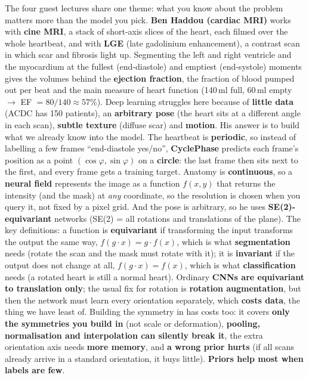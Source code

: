 \documentclass[a4paper]{article}
\newcommand{\K}[1]{\textcolor{kg}{\textbf{#1}}}
\newcommand{\F}[1]{\textcolor{fb}{#1}}
\newcommand{\E}[1]{\textcolor{ep}{#1}}
\newcommand{\T}[1]{\textcolor{tr}{\textbf{#1}}}
\newcommand{\ra}{\ensuremath{\to}}
\begin{document}
The four guest lectures share one theme: what you know about the problem matters more than the model you pick. \textbf{Ben Haddou (cardiac MRI)} works with \K{cine MRI}, a stack of short-axis slices of the heart, each filmed over the whole heartbeat, and with \K{LGE} (late gadolinium enhancement), a contrast scan in which scar and fibrosis light up. Segmenting the left and right ventricle and the myocardium at the fullest (end-diastole) and emptiest (end-systole) moments gives the volumes behind the \K{ejection fraction}, the fraction of blood pumped out per beat and the main measure of heart function (\E{140\,ml full, 60\,ml empty \ra{} EF $=80/140\approx57\%$}). Deep learning struggles here because of \K{little data} (ACDC has 150 patients), an \K{arbitrary pose} (the heart sits at a different angle in each scan), \K{subtle texture} (diffuse scar) and \K{motion}. His answer is to build what we already know into the model. The heartbeat is \K{periodic}, so instead of labelling a few frames ``end-diastole yes/no'', \K{CyclePhase} predicts each frame's position as a point $(\cos\varphi,\sin\varphi)$ on a \K{circle}: the last frame then sits next to the first, and every frame gets a training target.
Anatomy is \K{continuous}, so a \K{neural field} represents the image as a function $f(x,y)$ that returns the intensity (and the mask) at \emph{any} coordinate, so the resolution is chosen when you query it, not fixed by a pixel grid. And the pose is arbitrary, so he uses \K{SE(2)-equivariant} networks (SE(2) = all rotations and translations of the plane). The key definitions: a function is \K{equivariant} if transforming the input transforms the output the same way, \F{$f(g\cdot x)=g\cdot f(x)$}, which is what \K{segmentation} needs (rotate the scan and the mask must rotate with it); it is \K{invariant} if the output does not change at all, \F{$f(g\cdot x)=f(x)$}, which is what \K{classification} needs (a rotated heart is still a normal heart). Ordinary \T{CNNs are equivariant to translation only}; the usual fix for rotation is \K{rotation augmentation}, but then the network must learn every orientation separately, which \T{costs data}, the thing we have least of. Building the symmetry in has costs too: it covers \T{only the symmetries you build in} (not scale or deformation), \T{pooling, normalisation and interpolation can silently break it}, the extra orientation axis needs \T{more memory}, and \T{a wrong prior hurts} (if all scans already arrive in a standard orientation, it buys little). \K{Priors help most when labels are few}.
\end{document}
